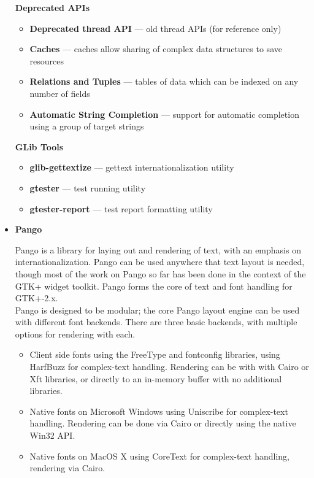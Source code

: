 \documentclass[12pt]{article}
\begin{document}
\begin{itemize}
\begin{itemize}
\end{itemize}

\textbf{Deprecated APIs}
\begin{itemize}


\item \textbf{Deprecated thread API} — old thread APIs (for reference only)
\item \textbf{Caches} — caches allow sharing of complex data structures to save resources
\item \textbf{Relations and Tuples} — tables of data which can be indexed on any number of fields
\item \textbf{Automatic String Completion} — support for automatic completion using a group of target strings





\end{itemize}


\textbf{GLib Tools}
\begin{itemize}


\item \textbf{glib-gettextize} — gettext internationalization utility
\item \textbf{gtester} — test running utility
\item \textbf{gtester-report} — test report formatting utility





\end{itemize}


\item \textbf{Pango}

Pango is a library for laying out and rendering of text, with an emphasis on internationalization. Pango can be used anywhere that text layout is needed, though most of the work on Pango so far has been done in the context of the GTK+ widget toolkit. Pango forms the core of text and font handling for GTK+-2.x.\\

Pango is designed to be modular; the core Pango layout engine can be used with different font backends. There are three basic backends, with multiple options for rendering with each.

\begin{itemize}
\item Client side fonts using the FreeType and fontconfig libraries, using HarfBuzz for complex-text handling. Rendering can be with with Cairo or Xft libraries, or directly to an in-memory buffer with no additional libraries.
\item Native fonts on Microsoft Windows using Uniscribe for complex-text handling. Rendering can be done via Cairo or directly using the native Win32 API.
\item Native fonts on MacOS X using CoreText for complex-text handling, rendering via Cairo.


\end{itemize}
\end{itemize}
\end{document}
